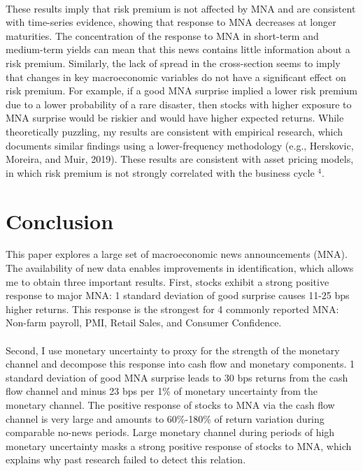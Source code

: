 \documentclass[12pt]{article}
\begin{document}
\paragraph{}
These results imply that risk premium is not affected by MNA and are consistent with time-series evidence, showing that response to MNA decreases at longer maturities. The concentration of the response to MNA in short-term and medium-term yields can mean that this news contains little information about a risk premium. Similarly, the lack of spread in the cross-section seems to imply that changes in key macroeconomic variables do not have a significant effect on risk premium.
For example, if a good MNA surprise implied a lower risk premium due to a lower probability of a rare disaster, then stocks with higher exposure to MNA surprise would be riskier and would have higher expected returns. While theoretically puzzling, my results are consistent with empirical research, which documents similar findings using a lower-frequency methodology (e.g., Herskovic, Moreira, and Muir, 2019). These results are consistent with asset pricing models, in which risk premium is not strongly correlated with the business cycle $^4$. 


\section{Conclusion} \label{sec:Model}

This paper explores a large set of macroeconomic news announcements (MNA). The availability of new data enables improvements in identification, which allows me to obtain three important results. First, stocks exhibit a strong positive response to major MNA: 1 standard deviation of good surprise causes 11-25 bps higher returns. This response is the strongest for 4 commonly reported MNA: Non-farm payroll, PMI, Retail Sales, and Consumer Confidence. 
\paragraph{}
Second, I use monetary uncertainty to proxy for the strength of the monetary channel and decompose this response into cash flow and monetary components. 1 standard deviation of good MNA surprise leads to 30 bps returns from the cash flow channel and minus 23 bps per 1\% of monetary uncertainty from the monetary channel. The positive response of stocks to MNA via the cash flow channel is very large and amounts to 60\%-180\% of return variation during comparable no-news periods. Large monetary channel during periods of high monetary uncertainty masks a strong positive response of stocks to MNA, which explains why past research failed to detect this relation.
\end{document}
